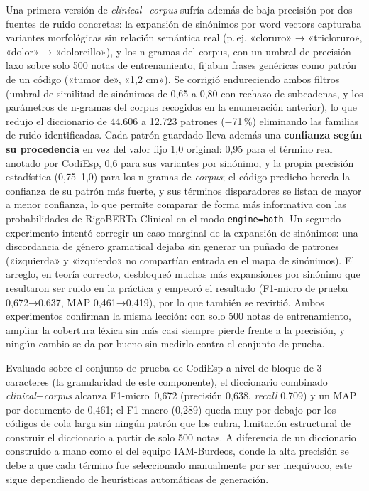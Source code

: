 Una primera versión de \emph{clinical}+\emph{corpus} sufría además de baja precisión por dos fuentes de ruido concretas: la expansión de sinónimos por word vectors capturaba variantes morfológicas sin relación semántica real (p.\,ej. «cloruro» → «tricloruro», «dolor» → «dolorcillo»), y los n-gramas del corpus, con un umbral de precisión laxo sobre solo 500 notas de entrenamiento, fijaban frases genéricas como patrón de un código («tumor de», «1,2 cm»). Se corrigió endureciendo ambos filtros (umbral de similitud de sinónimos de 0,65 a 0,80 con rechazo de subcadenas, y los parámetros de n-gramas del corpus recogidos en la enumeración anterior), lo que redujo el diccionario de 44.606 a 12.723 patrones ($-$71\,\%) eliminando las familias de ruido identificadas. Cada patrón guardado lleva además una \textbf{confianza según su procedencia} en vez del valor fijo 1,0 original: 0,95 para el término real anotado por CodiEsp, 0,6 para sus variantes por sinónimo, y la propia precisión estadística (0,75--1,0) para los n-gramas de \emph{corpus}; el código predicho hereda la confianza de su patrón más fuerte, y sus términos disparadores se listan de mayor a menor confianza, lo que permite comparar de forma más informativa con las probabilidades de RigoBERTa-Clinical en el modo \texttt{engine=\textquotedbl{}both\textquotedbl{}}. Un segundo experimento intentó corregir un caso marginal de la expansión de sinónimos: una discordancia de género gramatical dejaba sin generar un puñado de patrones («izquierda» y «izquierdo» no compartían entrada en el mapa de sinónimos). El arreglo, en teoría correcto, desbloqueó muchas más expansiones por sinónimo que resultaron ser ruido en la práctica y empeoró el resultado (F1-micro de prueba 0,672→0,637, MAP 0,461→0,419), por lo que también se revirtió. Ambos experimentos confirman la misma lección: con solo 500 notas de entrenamiento, ampliar la cobertura léxica sin más casi siempre pierde frente a la precisión, y ningún cambio se da por bueno sin medirlo contra el conjunto de prueba.

Evaluado sobre el conjunto de prueba de CodiEsp a nivel de bloque de 3 caracteres (la granularidad de este componente), el diccionario combinado \emph{clinical}+\emph{corpus} alcanza F1-micro~0,672 (precisión 0,638, \emph{recall} 0,709) y un MAP por documento de 0,461; el F1-macro (0,289) queda muy por debajo por los códigos de cola larga sin ningún patrón que los cubra, limitación estructural de construir el diccionario a partir de solo 500 notas. A diferencia de un diccionario construido a mano como el del equipo IAM-Burdeos, donde la alta precisión se debe a que cada término fue seleccionado manualmente por ser inequívoco, este sigue dependiendo de heurísticas automáticas de generación.

